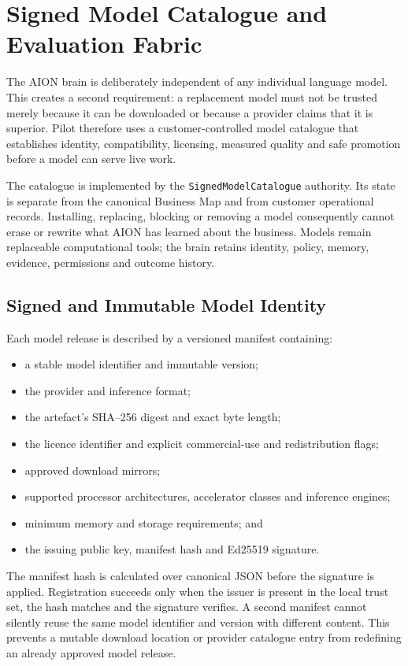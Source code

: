 \section{Signed Model Catalogue and Evaluation Fabric}
\label{sec:signed-model-catalogue}

The AION brain is deliberately independent of any individual language model.  This
creates a second requirement: a replacement model must not be trusted merely because
it can be downloaded or because a provider claims that it is superior.  Pilot therefore
uses a customer-controlled model catalogue that establishes identity, compatibility,
licensing, measured quality and safe promotion before a model can serve live work.

The catalogue is implemented by the \texttt{SignedModelCatalogue} authority.  Its state
is separate from the canonical Business Map and from customer operational records.
Installing, replacing, blocking or removing a model consequently cannot erase or rewrite
what AION has learned about the business.  Models remain replaceable computational tools;
the brain retains identity, policy, memory, evidence, permissions and outcome history.

\subsection{Signed and Immutable Model Identity}

Each model release is described by a versioned manifest containing:
\begin{itemize}
  \item a stable model identifier and immutable version;
  \item the provider and inference format;
  \item the artefact's SHA--256 digest and exact byte length;
  \item the licence identifier and explicit commercial-use and redistribution flags;
  \item approved download mirrors;
  \item supported processor architectures, accelerator classes and inference engines;
  \item minimum memory and storage requirements; and
  \item the issuing public key, manifest hash and Ed25519 signature.
\end{itemize}

The manifest hash is calculated over canonical JSON before the signature is applied.
Registration succeeds only when the issuer is present in the local trust set, the hash
matches and the signature verifies.  A second manifest cannot silently reuse the same
model identifier and version with different content.  This prevents a mutable download
location or provider catalogue entry from redefining an already approved model release.

